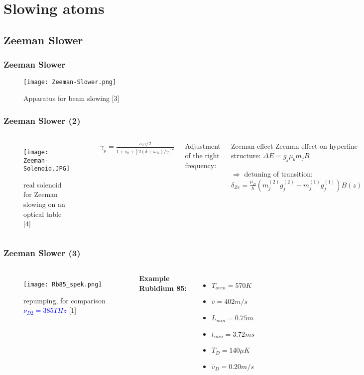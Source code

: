 \documentclass[aspectratio=169]{beamer}
\begin{document}
\section{Slowing atoms}

\subsection{Zeeman Slower}

\begin{frame}
  \frametitle{Zeeman Slower}
  \begin{figure}
    \centering
    \texttt{[image: Zeeman-Slower.png]}
    \caption{Apparatus for beam slowing [3]}
  \end{figure}
\end{frame}

\begin{frame}
  \frametitle{Zeeman Slower (2)}
  \begin{columns}
    \begin{figure}
      \centering
      \texttt{[image: Zeeman-Solenoid.JPG]}
      \caption{real solenoid for Zeeman slowing on an optical table [4]}
    \end{figure} 
     {\Large $\gamma_p=\frac{s_0\gamma/2}{1+s_0+[2(\delta+\omega_D)/\gamma]^2}$}
     
     \medskip
     
     Adjustment of the right frequency:
     \pause
     \medskip 
     \begin{block}{Zeeman effect}
       Zeeman effect on hyperfine structure: $ \Delta E = g_j \mu_b m_j B$
       \smallskip
       
       $\Rightarrow$ detuning of transition: $\delta_{Ze} = \frac{\mu_B}{\hbar} (m^{(2)}_j g^{(2)}_j - m^{(1)}_j g^{(1)}_j) B(z) $
     \end{block}
     
  \end{columns}
\end{frame}

\begin{frame}
  \frametitle{Zeeman Slower (3)}
  \begin{columns}
    \begin{figure}
      \centering
      \texttt{[image: Rb85\_spek.png]}
      \caption{repumping, for comparison \textcolor{blue}{$\nu_{D2} = 385 THz$ }[1]}
    \end{figure} 
   \pause
     \textbf{Example Rubidium 85:}
     \begin{itemize}
       \item $T_{oven} = 570K$
       \item $\bar{v} = 402 m/s$
       \item $L_{min} = 0.75 m$
       \item $t_{min} = 3.72 ms$
       \item $T_D = 140 \mu K$
       \item $\bar{v}_D = 0.20 m/s$
     \end{itemize}
  \end{columns}
\end{frame}
\end{document}
